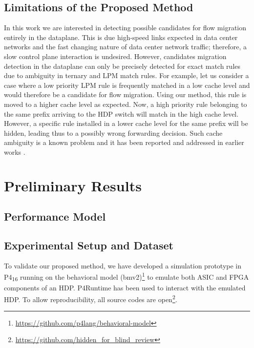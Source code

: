 \subsection{Limitations of the Proposed Method}\label{sec:method:limitations}

In this work we are interested in detecting possible candidates for flow migration entirely in the dataplane. This is due high-speed links expected in data center networks and the fast changing nature of data center network traffic; therefore, a slow control plane interaction is undesired. However, candidates migration detection in the dataplane can only be precisely detected for exact match rules due to ambiguity in ternary and LPM match rules. For example, let us consider a case where a low priority LPM rule is frequently matched in a low cache level and would therefore be a candidate for flow migration. Using our method, this rule is moved to a higher cache level as expected. Now, a high priority rule belonging to the same prefix arriving to the HDP switch will match in the high cache level. However, a specific rule installed in a lower cache level for the same prefix will be hidden, leading thus to a possibly wrong forwarding decision.   
Such cache ambiguity is a known problem and it has been reported and addressed in earlier works \cite{Degermark:1997,Katta:2014}.

\section{Preliminary Results}\label{sec:results}

\subsection{Performance Model}\label{sec:model}

\subsection{Experimental Setup and Dataset}\label{sec:results:setup}

To validate our proposed method, we have developed a simulation prototype in P4\textsubscript{16} running on the behavioral model (bmv2)\footnote{\url{https://github.com/p4lang/behavioral-model}} to emulate both ASIC and FPGA components of an HDP. P4Runtime has been used to interact with the emulated HDP. To allow reproducibility, all source codes are open\footnote{\url{https://github.com/hidden_for_blind_review}}.


